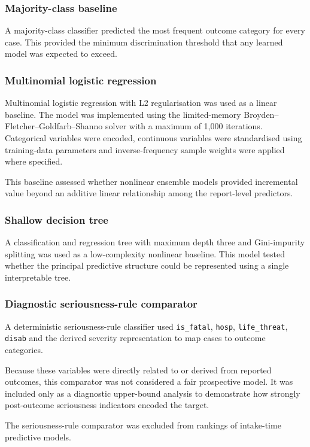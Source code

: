 \documentclass[10pt]{article}
\begin{document}
\subsubsection{Majority-class baseline}
A majority-class classifier predicted the most frequent outcome category for every case. This provided the minimum discrimination threshold that any learned model was expected to exceed.

\subsubsection{Multinomial logistic regression}
Multinomial logistic regression with L2 regularisation was used as a linear baseline. The model was implemented using the limited-memory Broyden--Fletcher--Goldfarb--Shanno solver with a maximum of 1,000 iterations. Categorical variables were encoded, continuous variables were standardised using training-data parameters and inverse-frequency sample weights were applied where specified.

This baseline assessed whether nonlinear ensemble models provided incremental value beyond an additive linear relationship among the report-level predictors.

\subsubsection{Shallow decision tree}
A classification and regression tree with maximum depth three and Gini-impurity splitting was used as a low-complexity nonlinear baseline. This model tested whether the principal predictive structure could be represented using a single interpretable tree.

\subsubsection{Diagnostic seriousness-rule comparator}
A deterministic seriousness-rule classifier used \texttt{is\_fatal}, \texttt{hosp}, \texttt{life\_threat}, \texttt{disab} and the derived severity representation to map cases to outcome categories.

Because these variables were directly related to or derived from reported outcomes, this comparator was not considered a fair prospective model. It was included only as a diagnostic upper-bound analysis to demonstrate how strongly post-outcome seriousness indicators encoded the target.

The seriousness-rule comparator was excluded from rankings of intake-time predictive models.
\end{document}
